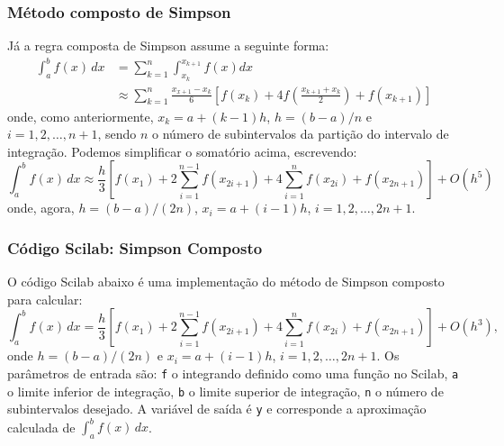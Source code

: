 \subsubsection{Método composto de Simpson}
Já a regra composta de Simpson assume a seguinte forma:
\begin{align*}
  \int_{a}^b f(x)\,dx &= \sum_{k=1}^{n} \int_{x_k}^{x_{k+1}} f(x)dx \\
  &\approx \sum_{k=1}^{n} \frac{x_{x+1}-x_k}{6}\left[f(x_k) + 4f\left(\frac{x_{k+1}+x_k}{2}\right)+f(x_{k+1})\right]
\end{align*}
onde, como anteriormente, $x_k = a + (k-1)h$, $h = (b-a)/n$ e $i = 1,2,\dotsc,n+1$, sendo $n$ o número de subintervalos da partição do intervalo de integração. Podemos simplificar o somatório acima, escrevendo:
\begin{equation*}
  \int_{a}^b f(x)\,dx \approx \frac{h}{3}\left[f(x_1) + 2\sum_{i=1}^{n-1} f(x_{2i+1}) + 4\sum_{i=1}^{n} f(x_{2i}) + f(x_{2n+1})\right] + O(h^5)
\end{equation*}
onde, agora, $h = (b-a)/(2n)$, $x_i = a + (i-1)h$, $i=1,2,\dotsc,2n+1$.

\ifisscilab
\subsubsection{Código Scilab: Simpson Composto}
O código Scilab abaixo é uma implementação do método de Simpson composto para calcular:
\begin{equation*}
  \int_a^b f(x)\,dx = \frac{h}{3}\left[f(x_1) + 2\sum_{i=1}^{n-1} f(x_{2i+1}) + 4\sum_{i=1}^{n} f(x_{2i}) + f(x_{2n+1})\right] + O(h^3),
\end{equation*}
onde $h = (b-a)/(2n)$ e $x_i = a + (i-1)h$, $i=1,2,\dotsc,2n+1$. Os parâmetros de entrada são: \verb+f+ o integrando definido como uma função no Scilab, \verb+a+ o limite inferior de integração, \verb+b+ o limite superior de integração, \verb+n+ o número de subintervalos desejado. A variável de saída é \verb+y+ e corresponde a aproximação calculada de $\int_a^b f(x)\, dx$.

\fi

